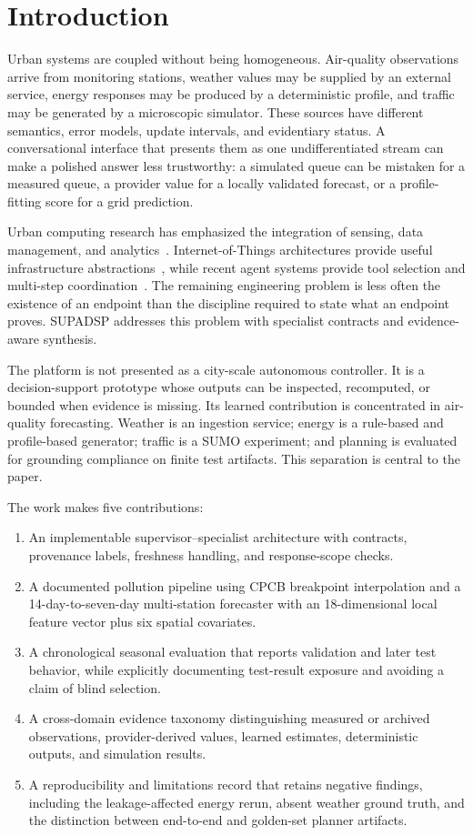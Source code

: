 \documentclass[conference]{IEEEtran}
\begin{document}
\section{Introduction}
Urban systems are coupled without being homogeneous. Air-quality observations arrive from monitoring stations, weather values may be supplied by an external service, energy responses may be produced by a deterministic profile, and traffic may be generated by a microscopic simulator. These sources have different semantics, error models, update intervals, and evidentiary status. A conversational interface that presents them as one undifferentiated stream can make a polished answer less trustworthy: a simulated queue can be mistaken for a measured queue, a provider value for a locally validated forecast, or a profile-fitting score for a grid prediction.

Urban computing research has emphasized the integration of sensing, data management, and analytics~\cite{zheng2014urban,batty2012smart}. Internet-of-Things architectures provide useful infrastructure abstractions~\cite{zanella2014internet,gharaibeh2017smart}, while recent agent systems provide tool selection and multi-step coordination~\cite{yao2023react,wu2023autogen,wang2024survey_agents}. The remaining engineering problem is less often the existence of an endpoint than the discipline required to state what an endpoint proves. SUPADSP addresses this problem with specialist contracts and evidence-aware synthesis.

The platform is not presented as a city-scale autonomous controller. It is a decision-support prototype whose outputs can be inspected, recomputed, or bounded when evidence is missing. Its learned contribution is concentrated in air-quality forecasting. Weather is an ingestion service; energy is a rule-based and profile-based generator; traffic is a SUMO experiment; and planning is evaluated for grounding compliance on finite test artifacts. This separation is central to the paper.

The work makes five contributions:
\begin{enumerate}
\item An implementable supervisor--specialist architecture with contracts, provenance labels, freshness handling, and response-scope checks.
\item A documented pollution pipeline using CPCB breakpoint interpolation and a 14-day-to-seven-day multi-station forecaster with an 18-dimensional local feature vector plus six spatial covariates.
\item A chronological seasonal evaluation that reports validation and later test behavior, while explicitly documenting test-result exposure and avoiding a claim of blind selection.
\item A cross-domain evidence taxonomy distinguishing measured or archived observations, provider-derived values, learned estimates, deterministic outputs, and simulation results.
\item A reproducibility and limitations record that retains negative findings, including the leakage-affected energy rerun, absent weather ground truth, and the distinction between end-to-end and golden-set planner artifacts.
\end{enumerate}
\end{document}
